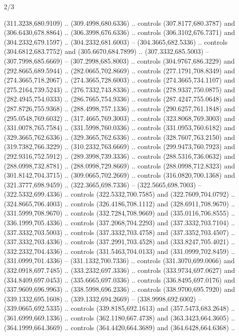 \begin{flagdescription}{2/3}
\begin{scope}[xshift=0.5\flaglength,yshift=0.5\flagwidth,scale=\flagwidth/525.28]
\begin{scope}[y=0.1mm, x=0.1mm, yscale=-1,shift={(-381.5,-404)}]
\begin{scope}[shift={(5.25001,4.53053)},miter limit=4.00,line width=0.800\lw]
  (311.3238,680.9109) .. (309.4998,680.6336) .. controls (307.8177,680.3787) and
  (306.6430,678.8864) .. (306.3998,676.6336) .. controls (306.3102,676.7371) and
  (304.2332,679.1597) .. (304.2332,681.6003) -- (304.3665,682.5336) .. controls
  (304.6812,683.7752) and (305.6670,684.7899) .. (307.3332,685.5003) --
  (307.7998,685.6669) -- (307.2998,685.8003) .. controls (304.9767,686.3229) and
  (292.8665,689.5944) .. (282.0665,702.8669) .. controls (277.1791,708.8349) and
  (274.3665,718.2067) .. (274.3665,728.6003) .. controls (274.3665,734.1107) and
  (275.2164,739.5243) .. (276.7332,743.8336) .. controls (278.9337,750.0875) and
  (282.4945,754.0333) .. (286.7665,754.9336) .. controls (287.4247,755.0648) and
  (287.8726,755.9368) .. (288.4998,757.1336) .. controls (290.6257,761.1848) and
  (295.0548,769.6032) .. (317.4665,769.3003) .. controls (323.8068,769.3003) and
  (331.0078,765.7584) .. (331.5998,760.0336) .. controls (331.0953,760.6182) and
  (329.3665,762.6336) .. (329.3665,762.6336) .. controls (328.7607,763.2150) and
  (319.7382,766.3229) .. (310.2332,763.6669) .. controls (299.9473,760.7923) and
  (292.9316,752.5912) .. (289.3998,739.3336) .. controls (288.5316,736.0632) and
  (288.0998,732.8781) .. (288.0998,729.8669) .. controls (288.0998,712.8323) and
  (301.8142,704.3715) .. (309.0665,702.2669) .. controls (316.0820,700.1368) and
  (321.3777,698.9459) .. (322.3665,698.7336) -- (322.5665,698.7003) --
  (322.5332,699.4336) .. controls (322.5332,700.7585) and (322.7609,704.0792) ..
  (324.8665,706.4003) .. controls (326.4186,708.1112) and (328.6911,708.9670) ..
  (331.5999,708.9670) .. controls (332.7284,708.9669) and (335.0116,706.8555) ..
  (336.1999,705.4336) .. controls (337.2068,704.2293) and (337.3332,703.7104) ..
  (337.3332,703.5003) .. controls (337.3332,703.4758) and (337.3352,703.4507) ..
  (337.3332,703.4336) .. controls (337.2991,703.4528) and (333.8247,705.4021) ..
  (332.2332,704.4336) .. controls (331.5463,704.0133) and (331.0999,702.8459) ..
  (331.0999,701.4336) -- (331.1332,700.7336) .. controls (331.3070,699.0066) and
  (332.0918,697.7485) .. (333.2332,697.3336) .. controls (333.9734,697.0627) and
  (334.8409,697.0453) .. (335.6665,697.0336) .. controls (336.8495,697.0176) and
  (337.9609,696.9963) .. (338.5998,696.2336) .. controls (338.9700,695.7920) and
  (339.1332,695.1608) .. (339.1332,694.2669) -- (338.9998,692.6002) --
  (339.0665,692.5335) .. controls (339.8185,692.1613) and (357.5473,683.2648) ..
  (361.6999,669.1336) .. controls (362.1180,667.4738) and (363.3423,664.3605) ..
  (364.1999,664.3669) .. controls (364.4420,664.3689) and (364.6428,664.6368) ..

\end{scope}
\end{scope}
\end{scope}
\end{flagdescription}
